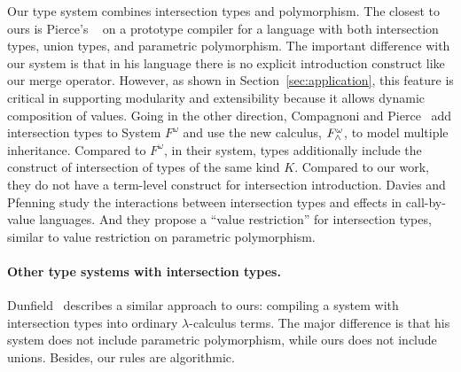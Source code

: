 Our type system combines intersection types and polymorphism. The closest to
ours is Pierce's ~\cite{pierce1991programming1} on a prototype compiler for a
language with both intersection types, union types, and parametric polymorphism.
The important difference with our system is that in his language there is no
explicit introduction construct like our merge operator. However, as shown in
Section~\ref{sec:application}, this feature is critical in supporting modularity
and extensibility because it allows dynamic composition of values. Going in the
other direction, Compagnoni and Pierce~\cite{compagnoni1996higher} add
intersection types to System $ F^{\omega} $ and use the new calculus,
$ F^{\omega}_{\wedge} $, to model multiple inheritance. Compared to
$ F^{\omega} $, in their system, types additionally include the construct of
intersection of types of the same kind $ K $. Compared to our work, they do not
have a term-level construct for intersection introduction. Davies and Pfenning
\cite{davies2000intersection} study the interactions between intersection types
and effects in call-by-value languages. And they propose a ``value restriction''
for intersection types, similar to value restriction on parametric polymorphism.

\paragraph{Other type systems with intersection types.}

Dunfield~\cite{dunfield2014elaborating} describes a similar approach to ours:
compiling a system with intersection types into ordinary $ \lambda $-calculus
terms. The major difference is that his system does not include parametric
polymorphism, while ours does not include unions. Besides, our rules are algorithmic.


